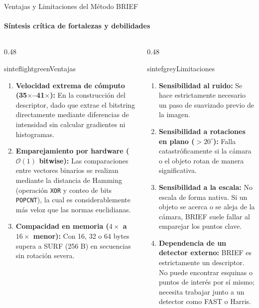 \documentclass{beamer}
\begin{document}

\begin{frame}{Ventajas y Limitaciones del Método BRIEF}
\framesubtitle{Síntesis crítica de fortalezas y debilidades}
\begin{columns}[T]
\begin{column}{0.48\textwidth}
\begin{colorblock}[black]{sinteflightgreen}{Ventajas}
\scriptsize
\begin{enumerate}\setlength{\itemsep}{2.5pt}
    \item \textbf{Velocidad extrema de cómputo (35$\times$--41$\times$):} En la construcción del descriptor, dado que extrae el bitstring directamente mediante diferencias de intensidad sin calcular gradientes ni histogramas.
    \item \textbf{Emparejamiento por hardware ($\mathcal{O}(1)$ bitwise):}  Las comparaciones entre vectores binarios se realizan mediante la distancia de Hamming (operación \texttt{XOR} y conteo de bits \texttt{POPCNT}), la cual es considerablemente más veloz que las normas euclidianas.
    \item \textbf{Compacidad en memoria ($4\times$ a $16\times$ menor):} Con 16, 32 o 64 bytes supera a SURF (256 B) en secuencias sin rotación severa.
\end{enumerate}
\end{colorblock}
\end{column}
\begin{column}{0.48\textwidth}
\begin{colorblock}[black]{sintefgrey}{Limitaciones}
\scriptsize
\begin{enumerate}\setlength{\itemsep}{2.5pt}
    \item \textbf{Sensibilidad al ruido:} Se hace estrictamente necesario un paso de suavizado previo de la imagen.
    \item \textbf{Sensibilidad a rotaciones en plano ($>20^\circ$):} Falla catastróficamente si la cámara o el objeto rotan de manera significativa.
    \item \textbf{Sensibilidad a la escala:} No escala de forma nativa. Si un objeto se acerca o se aleja de la cámara, BRIEF suele fallar al emparejar los puntos clave.
    \item \textbf{Dependencia de un detector externo:} BRIEF es estrictamente un descriptor. No puede encontrar esquinas o puntos de interés por sí mismo; necesita trabajar junto a un detector como FAST o Harris.
\end{enumerate}
\end{colorblock}
\end{column}
\end{columns}
\end{frame}
\end{document}
